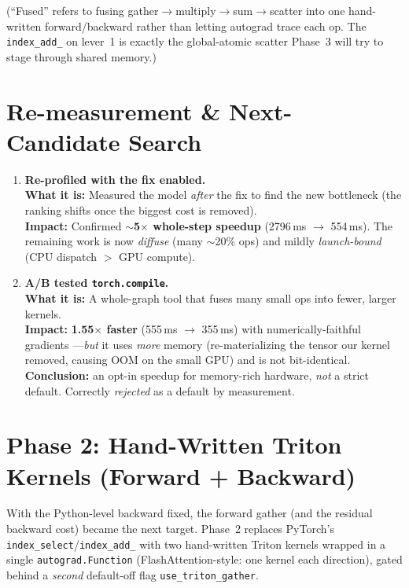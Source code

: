 \documentclass[11pt]{article}
\newcommand{\what}[1]{\textbf{What it is:} #1}
\newcommand{\impact}[1]{\textbf{Impact:} #1}
\begin{document}
\noindent (``Fused'' refers to fusing gather$\to$multiply$\to$sum$\to$scatter into one hand-written
forward/backward rather than letting autograd trace each op. The \texttt{index\_add\_} on lever~1
is exactly the global-atomic scatter Phase~3 will try to stage through shared memory.)

\section{Re-measurement \& Next-Candidate Search}

\begin{enumerate}[leftmargin=*, resume]

\item \textbf{Re-profiled with the fix enabled.}\\
\what{Measured the model \emph{after} the fix to find the new bottleneck (the ranking shifts once
the biggest cost is removed).}\\
\impact{Confirmed \textbf{$\sim$5$\times$ whole-step speedup} (2796\,ms $\to$ 554\,ms). The
remaining work is now \emph{diffuse} (many $\sim$20\% ops) and mildly \emph{launch-bound}
(CPU dispatch $>$ GPU compute).}

\item \textbf{A/B tested \texttt{torch.compile}.}\\
\what{A whole-graph tool that fuses many small ops into fewer, larger kernels.}\\
\impact{\textbf{1.55$\times$ faster} (555\,ms $\to$ 355\,ms) with numerically-faithful gradients
---\emph{but} it uses \emph{more} memory (re-materializing the tensor our kernel removed, causing
OOM on the small GPU) and is not bit-identical. \textbf{Conclusion:} an opt-in speedup for
memory-rich hardware, \emph{not} a strict default. Correctly \emph{rejected} as a default by
measurement.}

\end{enumerate}

\section{Phase 2: Hand-Written Triton Kernels (Forward + Backward)}

With the Python-level backward fixed, the forward gather (and the residual backward cost)
became the next target. Phase~2 replaces PyTorch's \texttt{index\_select}/\texttt{index\_add\_}
with two hand-written Triton kernels wrapped in a single \texttt{autograd.Function}
(FlashAttention-style: one kernel each direction), gated behind a \emph{second} default-off flag
\texttt{use\_triton\_gather}.
\end{document}
